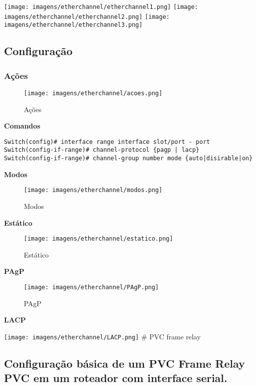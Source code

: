 \documentclass[]{article}
\begin{document}
\texttt{[image: imagens/etherchannel/etherchannel1.png]}
\texttt{[image: imagens/etherchannel/etherchannel2.png]}
\texttt{[image: imagens/etherchannel/etherchannel3.png]}

\hypertarget{configurauxe7uxe3o}{%
\subsection{Configuração}\label{configurauxe7uxe3o}}

\hypertarget{auxe7uxf5es}{%
\subsubsection{Ações}\label{auxe7uxf5es}}

\begin{figure}
\centering
\texttt{[image: imagens/etherchannel/acoes.png]}
\caption{Ações}
\end{figure}

\textbf{Comandos}

\begin{verbatim}
Switch(config)# interface range interface slot/port - port
Switch(config-if-range)# channel-protocol {pagp | lacp}
Switch(config-if-range)# channel-group number mode {auto|disirable|on}
\end{verbatim}

\textbf{Modos}

\begin{figure}
\centering
\texttt{[image: imagens/etherchannel/modos.png]}
\caption{Modos}
\end{figure}

\textbf{Estático}

\begin{figure}
\centering
\texttt{[image: imagens/etherchannel/estatico.png]}
\caption{Estático}
\end{figure}

\textbf{PAgP}

\begin{figure}
\centering
\texttt{[image: imagens/etherchannel/PAgP.png]}
\caption{PAgP}
\end{figure}

\textbf{LACP}

\texttt{[image: imagens/etherchannel/LACP.png]} \# PVC frame relay

\hypertarget{configurauxe7uxe3o-buxe1sica-de-um-pvc-frame-relay-pvc-em-um-roteador-com-interface-serial.}{%
\subsection{Configuração básica de um PVC Frame Relay PVC em um roteador
com interface
serial.}\label{configurauxe7uxe3o-buxe1sica-de-um-pvc-frame-relay-pvc-em-um-roteador-com-interface-serial.}}
\end{document}
